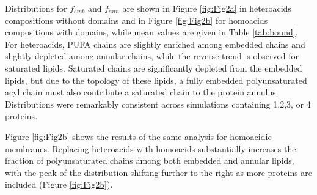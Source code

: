 Distributions for $f_{emb}$ and $f_{ann}$ are shown in Figure \ref{fig:Fig2a} in heteroacids compositions without domains and in Figure \ref{fig:Fig2b} for homoacids compositions with domains, while mean values are given in Table \ref{tab:bound}.  For heteroacids, PUFA chains are slightly enriched among embedded chains and slightly depleted among annular chains, while the reverse trend is observed for saturated lipids.  Saturated chains are significantly depleted from the embedded lipids, but due to the topology of these lipids, a fully embedded polyunsaturated acyl chain must also contribute a saturated chain to the protein annulus. Distributions were remarkably consistent across simulations containing 1,2,3, or 4 proteins.


Figure \ref{fig:Fig2b} shows the results of the same analysis for homoacidic membranes.  Replacing heteroacids with homoacids substantially increases the fraction of polyunsaturated chains among both embedded and annular lipids, with the peak of the distribution shifting further to the right as more proteins are included (Figure \ref{fig:Fig2b}). %

